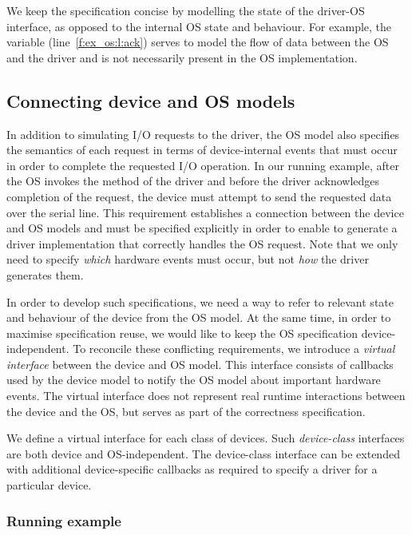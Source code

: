 We keep the specification concise by modelling the state of the driver-OS interface, as opposed to the internal OS state and behaviour.  For example, the  variable (line~\ref{f:ex_os:l:ack}) serves to model the flow of data between the OS and the driver and is not necessarily present in the OS implementation.

\subsection{Connecting device and OS models}
\label{s:virt}

In addition to simulating I/O requests to the driver, the OS model also specifies the semantics of each request in terms of device-internal events that must occur in order to complete the requested I/O operation.  In our running example, after the OS invokes the  method of the driver and before the driver acknowledges completion of the request, the device must attempt to send the requested data over the serial line.  This requirement establishes a connection between the device and OS models and must be specified explicitly in order to enable \termite to generate a driver implementation that correctly handles the OS request.  Note that we only need to specify \emph{which} hardware events must occur, but not \emph{how} the driver generates them.

In order to develop such specifications, we need a way to refer to relevant state and behaviour of the device from the OS model.  At the same time, in order to maximise specification reuse, we would like to keep the OS specification device-independent.  To reconcile these conflicting requirements, we introduce a \emph{virtual interface} between the device and OS model.  This interface consists of callbacks used by the device model to notify the OS model about important hardware events.  The virtual interface does not represent real runtime interactions between the device and the OS, but serves as part of the correctness specification.

We define a virtual interface for each class of devices.  Such \emph{device-class} interfaces are both device and OS-independent.  The device-class interface can be extended with additional device-specific callbacks as required to specify a driver for a particular device.

\subsubsection{Running example}

